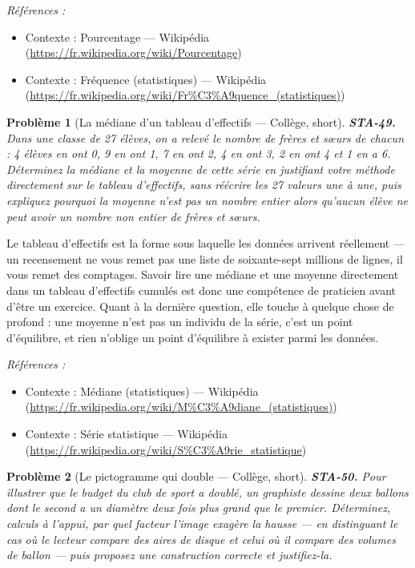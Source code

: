 \documentclass[11pt]{article}
\newtheorem{problem}{Problème}
\newenvironment{refs}{\par\small\noindent\emph{Références :}\begin{itemize}\setlength\itemsep{0pt}}{\end{itemize}\normalsize}
\begin{document}
\begin{refs}
\item Contexte : Pourcentage --- Wikipédia (\url{https://fr.wikipedia.org/wiki/Pourcentage})
\item Contexte : Fréquence (statistiques) --- Wikipédia (\url{https://fr.wikipedia.org/wiki/Fr%C3%A9quence_(statistiques)})
\end{refs}

\bigskip

\begin{problem}[{La médiane d'un tableau d'effectifs --- Collège, short}]
\textbf{STA-49.} Dans une classe de 27 élèves, on a relevé le nombre de frères
et s\oe{}urs de chacun : 4 élèves en ont 0, 9 en ont 1, 7 en ont 2, 4 en ont 3, 2 en ont 4 et 1 en a 6.
Déterminez la médiane et la moyenne de cette série en justifiant votre méthode directement sur le
tableau d'effectifs, sans réécrire les 27 valeurs une à une, puis expliquez pourquoi la moyenne
n'est pas un nombre entier alors qu'aucun élève ne peut avoir un nombre non entier de frères et
s\oe{}urs.
\end{problem}

\noindent Le tableau d'effectifs est la forme sous laquelle les données arrivent
réellement --- un recensement ne vous remet pas une liste de soixante-sept millions de lignes, il
vous remet des comptages. Savoir lire une médiane et une moyenne directement dans un tableau
d'effectifs cumulés est donc une compétence de praticien avant d'être un exercice. Quant à la
dernière question, elle touche à quelque chose de profond : une moyenne n'est pas un individu de la
série, c'est un point d'équilibre, et rien n'oblige un point d'équilibre à exister parmi les
données.

\begin{refs}
\item Contexte : Médiane (statistiques) --- Wikipédia (\url{https://fr.wikipedia.org/wiki/M%C3%A9diane_(statistiques)})
\item Contexte : Série statistique --- Wikipédia (\url{https://fr.wikipedia.org/wiki/S%C3%A9rie_statistique})
\end{refs}

\bigskip

\begin{problem}[{Le pictogramme qui double --- Collège, short}]
\textbf{STA-50.} Pour illustrer que le budget du club de sport a doublé, un
graphiste dessine deux ballons dont le second a un diamètre deux fois plus grand que le premier.
Déterminez, calculs à l'appui, par quel facteur l'image exagère la hausse --- en distinguant le cas
où le lecteur compare des aires de disque et celui où il compare des volumes de ballon --- puis
proposez une construction correcte et justifiez-la.
\end{problem}
\end{document}
